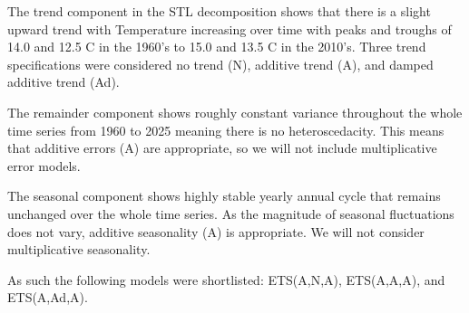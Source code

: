 \documentclass[11pt, a4paper]{article}\usepackage[]{graphicx}\usepackage[]{xcolor}
\begin{document}
The trend component in the STL decomposition shows that there is a slight upward trend with Temperature increasing over time with peaks and troughs of 14.0 and 12.5 C in the 1960's to 15.0 and 13.5 C in the 2010's. Three trend specifications were considered no trend (N), additive trend (A), and damped additive trend (Ad).

The remainder component shows roughly constant variance throughout the whole time series from 1960 to 2025 meaning there is no heteroscedacity. This means that additive errors (A) are appropriate, so we will not include multiplicative error models. 

The seasonal component shows highly stable yearly annual cycle that remains unchanged over the whole time series. As the magnitude of seasonal fluctuations does not vary, additive seasonality (A) is appropriate. We will not consider multiplicative seasonality.

As such the following models were shortlisted:
ETS(A,N,A), ETS(A,A,A), and ETS(A,Ad,A).
\end{document}

